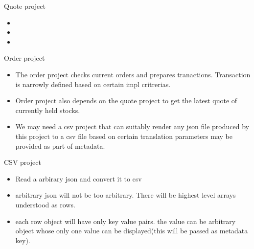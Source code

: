 \documentclass{beamer}
\begin{document}
\begin{frame}{Quote project}
	\begin{itemize}
		\item 
		\item 
		\item 

	\end{itemize}
\end{frame}

\begin{frame}{Order project}
	\begin{itemize}
		\item The order project checks current orders and prepares tranactions. Transaction is narrowly defined based on certain impl critrerias.
		\item Order project also depends on the quote project to get the latest quote of currently held stocks.
		\item We may need a csv project that can suitably render any json file produced by this project to a csv file based on  certain translation parameters may be provided as part of metadata.
		
	\end{itemize}
\end{frame}

\begin{frame}{CSV project}
	\begin{itemize}
		\item Read a arbirary json and convert it to csv
		\item arbitrary json will not be too arbitrary. There will be highest level arrays understood as rows.
		\item each row object will have only key value pairs. the value can be arbitrary object whose only one value can be displayed(this will be passed as metadata key).
	\end{itemize}
\end{frame}
\end{document}

